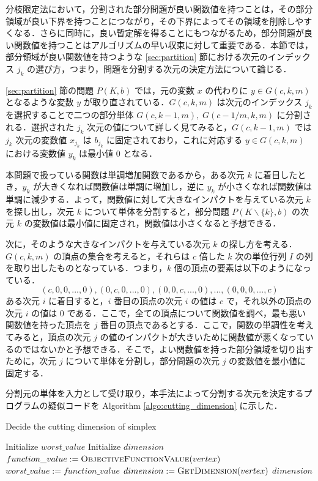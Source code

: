 \documentclass[a4paper,11pt]{jreport}
\begin{document}
分枝限定法において，分割された部分問題が良い関数値を持つことは，その部分領域が良い下界を持つことにつながり，その下界によってその領域を削除しやすくなる．さらに同時に，良い暫定解を得ることにもつながるため，部分問題が良い関数値を持つことはアルゴリズムの早い収束に対して重要である．本節では，部分領域が良い関数値を持つような \ref{sec:partition} 節における次元のインデックス $ j_k $ の選び方，つまり，問題を分割する次元の決定方法について論じる．\par
\ref{sec:partition} 節の問題 $ P(K, b) $ では，元の変数 $ x $ の代わりに $ y \in G(c, k, m) $ となるような変数 $ y $ が取り直されている．$ G(c, k, m) $ は次元のインデックス $ j_k $ を選択することで二つの部分単体 $ G(c, k-1, m), \; G(c-1/m, k, m) $ に分割される．選択された $ j_k $ 次元の値について詳しく見てみると，$ G(c, k - 1, m) $ では $ j_k $ 次元の変数値 $ x_{j_k} $ は $ b_{j_k} $ に固定されており，これに対応する $ y \in G(c, k, m) $ における変数値 $ y_k $ は最小値 $ 0 $ となる．\par
本問題で扱っている関数は単調増加関数であるから，ある次元 $ k $ に着目したとき，$ y_k $ が大きくなれば関数値は単調に増加し，逆に $ y_k $ が小さくなれば関数値は単調に減少する．よって，関数値に対して大きなインパクトを与えている次元 $ k $ を探し出し，次元 $ k $ について単体を分割すると，部分問題 $ P(K \backslash \{ k \}, b) $ の次元 $ k $ の変数値は最小値に固定され，関数値は小さくなると予想できる．\par
次に，そのような大きなインパクトを与えている次元 $ k $ の探し方を考える．$ G(c, k, m) $ の頂点の集合を考えると，それらは $ c $ 倍した $ k $ 次の単位行列 $ I $ の列を取り出したものとなっている．つまり，$ k $ 個の頂点の要素は以下のようになっている．
$$ (c, 0, 0, ..., 0), (0, c, 0, ..., 0), (0, 0, c, ..., 0), ..., (0, 0, 0, ..., c) $$
ある次元 $ i $ に着目すると，$ i $ 番目の頂点の次元 $ i $ の値は $ c $ で，それ以外の頂点の次元 $ i $ の値は $ 0 $ である．ここで，全ての頂点について関数値を調べ，最も悪い関数値を持った頂点を $ j $ 番目の頂点であるとする．ここで，関数の単調性を考えてみると，頂点の次元 $ j $ の値のインパクトが大きいために関数値が悪くなっているのではないかと予想できる．そこで，よい関数値を持った部分領域を切り出すために，次元 $ j $ について単体を分割し，部分問題の次元 $ j $ の変数値を最小値に固定する．\par
分割元の単体を入力として受け取り，本手法によって分割する次元を決定するプログラムの疑似コードを Algorithm \ref{algo:cutting_dimension} に示した．\par

\begin{algorithm}
\caption{Decide the cutting dimension of simplex}
\label{algo:cutting_dimension}
\begin{algorithmic}[1]
\State Initialize $ worst\_value $
\State Initialize $ dimension $
\State $ function\_value := \Call{ObjectiveFunctionValue}{vertex} $
\State $ worst\_value := function\_value $
\State $ dimension := \Call{GetDimension}{vertex} $
\EndIf
\EndFor
\State \Return $ dimension $
\EndFunction
\end{algorithmic}
\end{algorithm}
\end{document}
